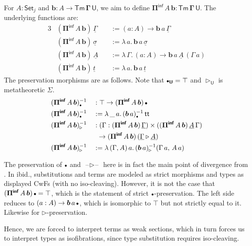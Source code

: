 \documentclass{article}
\theoremstyle{definition}
\theoremstyle{theorem}
\newcommand{\Tm}{\mathsf{Tm}}
\newcommand{\U}{\mathsf{U}}
\renewcommand{\tt}{\mathsf{tt}}
\newcommand{\blank}{\mathord{\hspace{1pt}\text{--}\hspace{1pt}}}
\newcommand{\ra}{\rightarrow}
\newcommand{\Set}{\mathsf{Set}}
\newcommand{\ext}{\triangleright}
\newcommand{\emptycon}{\scaleobj{.75}\bullet}
\newcommand{\Piinf}{\Pi^{\mathsf{inf}}}
\newcommand{\bTm}{\boldsymbol{\Tm}}
\newcommand{\bGamma}{\boldsymbol{\Gamma}}
\newcommand{\bb}{\boldsymbol{b}}
\newcommand{\bU}{\boldsymbol{\U}}
\newcommand{\bPiinf}{\boldsymbol{\Piinf}}
\newcommand{\ul}[1]{\underline{#1}}
\newcommand{\ulGamma}{\ul{\Gamma}}
\newcommand{\ulsigma}{\ul{\sigma}}
\newcommand{\ult}{\ul{t}}
\newcommand{\ulA}{\ul{A}}
\begin{document}
For $A : \Set_j$ and $\bb : A \ra \bTm\,\bGamma\,\bU$, we aim to define
$\bPiinf\,A\,\bb \boldsymbol{:} \bTm\,\bGamma\,\bU$. The underlying functions
are:
\begin{alignat*}{3}
  & (\bPiinf\,A\,\bb)\,\ulGamma    &&:= (a : A)\ra \bb\,a\,\ulGamma\\
  & (\bPiinf\,A\,\bb)\,\ulsigma    &&:= \lambda\,a.\, \bb\,a\,\ulsigma\\
  & (\bPiinf\,A\,\bb)\,\ulA\       &&:= \lambda\,\Gamma.\,(a : A)\ra \bb\,a\,\ulA\,(\Gamma\, a)\\
  & (\bPiinf\,A\,\bb)\,\ult        &&:= \lambda\,a.\, \bb\,a\,\ult
\end{alignat*}
The preservation morphisms are as follows. Note that $\emptycon_{\bU} = \top$ and $\ext_{\bU}$ is
metatheoretic $\Sigma$.
\begin{alignat*}{3}
  &(\bPiinf\,A\,\bb)_{\emptycon}^{-1} && : \top\ra (\bPiinf\,A\,\bb)\,\emptycon\\
  &(\bPiinf\,A\,\bb)_{\emptycon}^{-1} && := \lambda\,\_\,a.\,(\bb\,a)_{\emptycon}^{-1}\,\tt\\
  &(\bPiinf\,A\,\bb)_{\ext}^{-1} && : (\Gamma : (\bPiinf\,A\,\bb)\,\ulGamma)\times((\bPiinf\,A\,\bb)\,\ulA\,\Gamma)\\
  & && \hspace{0.5em}\ra (\bPiinf\,A\,\bb)\,(\ulGamma \ext \ulA)\\
  & (\bPiinf\,A\,\bb)_{\ext}^{-1} && := \lambda\,(\Gamma,A)\,a.\,(\bb\,a)_{\ext}^{-1}(\Gamma\,a,\,A\,a)
\end{alignat*}

The preservation of $\emptycon$ and $\blank\ext\blank$ here is in fact the main
point of divergence from \cite{kaposi2019constructing}. In ibid., substitutions
and terms are modeled as strict morphisms and types as displayed CwFs (with no
iso-cleaving). However, it is not the case that $(\bPiinf\,A\,\bb)\,\emptycon =
\top$, which is the statement of strict $\emptycon$-preservation. The left side
reduces to $(a : A)\ra \bb\,a\,\emptycon$, which is isomorphic to $\top$ but not
strictly equal to it. Likewise for $\ext$-preservation.

Hence, we are forced to
interpret terms as weak sections, which in turn forces us to interpret
types as isofibrations, since type substitution requires iso-cleaving.
\end{document}
